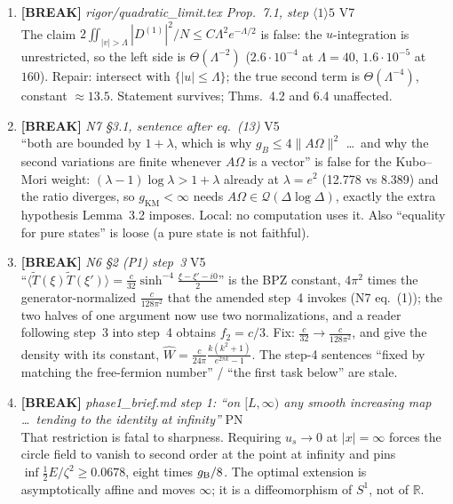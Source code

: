 \documentclass[11pt]{article}
\begin{document}
\begin{enumerate}[leftmargin=1.6em,itemsep=6pt]
\item \textbf{[BREAK]} \emph{rigor/quadratic\_limit.tex Prop.~7.1, step \(\langle1\rangle5\)} \hfill\textsc{V7}\\ The claim \(2\iint_{|v|>\Lambda}|D^{(1)}|^2/N\le C\Lambda^2e^{-\Lambda/2}\) is false: the \(u\)-integration is unrestricted, so the left side is \(\Theta(\Lambda^{-2})\) (\(2.6\cdot10^{-4}\) at \(\Lambda=40\), \(1.6\cdot10^{-5}\) at \(160\)). Repair: intersect with \(\{|u|\le\Lambda\}\); the true second term is \(\Theta(\Lambda^{-4})\), constant \(\approx13.5\). Statement survives; Thms.~4.2 and 6.4 unaffected.
\item \textbf{[BREAK]} \emph{N7 \S3.1, sentence after eq.\ (13)} \hfill\textsc{V5}\\ ``both are bounded by \(1+\lambda\), which is why \(g_B\le4\|A\Omega\|^2\) \dots\ and why the second variations are finite whenever \(A\Omega\) is a vector'' is false for the Kubo--Mori weight: \((\lambda-1)\log\lambda>1+\lambda\) already at \(\lambda=e^2\) (12.778 vs 8.389) and the ratio diverges, so \(g_{\mathrm{KM}}<\infty\) needs \(A\Omega\in\mathcal Q(\Delta\log\Delta)\), exactly the extra hypothesis Lemma~3.2 imposes. Local: no computation uses it. Also ``equality for pure states'' is loose (a pure state is not faithful).
\item \textbf{[BREAK]} \emph{N6 \S2 (P1) step~3} \hfill\textsc{V5}\\ ``\(\langle\widetilde T(\xi)\widetilde T(\xi')\rangle=\frac c{32}\sinh^{-4}\frac{\xi-\xi'-i0}2\)'' is the BPZ constant, \(4\pi^2\) times the generator-normalized \(\frac c{128\pi^2}\) that the amended step~4 invokes (N7 eq.\ (1)); the two halves of one argument now use two normalizations, and a reader following step~3 into step~4 obtains \(f_2=c/3\). Fix: \(\frac c{32}\to\frac c{128\pi^2}\), and give the density with its constant, \(\widehat W=\frac c{24\pi}\frac{k(k^2+1)}{e^{2\pi k}-1}\). The step-4 sentences ``fixed by matching the free-fermion number'' / ``the first task below'' are stale.
\item \textbf{[BREAK]} \emph{phase1\_brief.md step 1: ``on \([L,\infty)\) any smooth increasing map \dots\ tending to the identity at infinity''} \hfill\textsc{PN}\\ That restriction is fatal to sharpness. Requiring \(u_s\to0\) at \(|x|=\infty\) forces the circle field to vanish to second order at the point at infinity and pins \(\inf\tfrac12E/\zeta^2\ge0.0678\), eight times \(g_{\rm B}/8\). The optimal extension is asymptotically affine and moves \(\infty\); it is a diffeomorphism of \(S^1\), not of \(\mathbb R\).

\end{enumerate}
\end{document}
